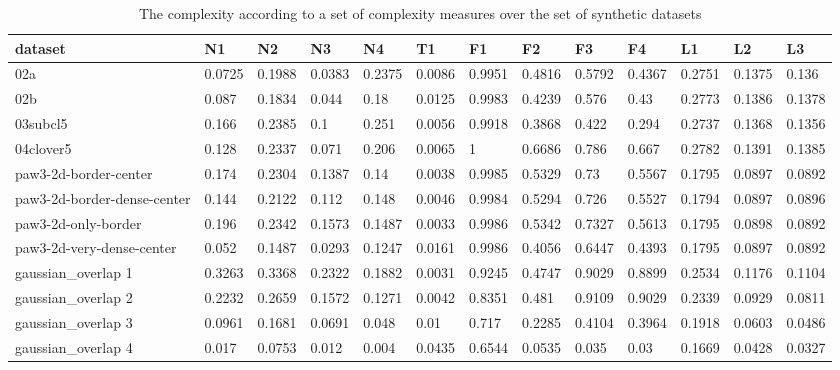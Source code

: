 \begin{landscape}
    \begin{table}[htp]
        \centering
        \caption{The complexity according to a set of complexity measures over the set of synthetic datasets}
        \begin{tabular}{|l|l|l|l|l|l|l|l|l|l|l|l|l|}
        \hline
            dataset & N1 & N2 & N3 & N4 & T1 & F1 & F2 & F3 & F4 & L1 & L2 & L3 \\ \hline
            02a & 0.0725 & 0.1988 & 0.0383 & 0.2375 & 0.0086 & 0.9951 & 0.4816 & 0.5792 & 0.4367 & 0.2751 & 0.1375 & 0.136 \\ \hline
            02b & 0.087 & 0.1834 & 0.044 & 0.18 & 0.0125 & 0.9983 & 0.4239 & 0.576 & 0.43 & 0.2773 & 0.1386 & 0.1378 \\ \hline
            03subcl5 & 0.166 & 0.2385 & 0.1 & 0.251 & 0.0056 & 0.9918 & 0.3868 & 0.422 & 0.294 & 0.2737 & 0.1368 & 0.1356 \\ \hline
            04clover5 & 0.128 & 0.2337 & 0.071 & 0.206 & 0.0065 & 1 & 0.6686 & 0.786 & 0.667 & 0.2782 & 0.1391 & 0.1385 \\ \hline
            paw3-2d-border-center & 0.174 & 0.2304 & 0.1387 & 0.14 & 0.0038 & 0.9985 & 0.5329 & 0.73 & 0.5567 & 0.1795 & 0.0897 & 0.0892 \\ \hline
            paw3-2d-border-dense-center & 0.144 & 0.2122 & 0.112 & 0.148 & 0.0046 & 0.9984 & 0.5294 & 0.726 & 0.5527 & 0.1794 & 0.0897 & 0.0896 \\ \hline
            paw3-2d-only-border & 0.196 & 0.2342 & 0.1573 & 0.1487 & 0.0033 & 0.9986 & 0.5342 & 0.7327 & 0.5613 & 0.1795 & 0.0898 & 0.0892 \\ \hline
            paw3-2d-very-dense-center & 0.052 & 0.1487 & 0.0293 & 0.1247 & 0.0161 & 0.9986 & 0.4056 & 0.6447 & 0.4393 & 0.1795 & 0.0897 & 0.0892 \\ \hline
            gaussian\_overlap 1 & 0.3263 & 0.3368 & 0.2322 & 0.1882 & 0.0031 & 0.9245 & 0.4747 & 0.9029 & 0.8899 & 0.2534 & 0.1176 & 0.1104 \\ \hline
            gaussian\_overlap 2 & 0.2232 & 0.2659 & 0.1572 & 0.1271 & 0.0042 & 0.8351 & 0.481 & 0.9109 & 0.9029 & 0.2339 & 0.0929 & 0.0811 \\ \hline
            gaussian\_overlap 3 & 0.0961 & 0.1681 & 0.0691 & 0.048 & 0.01 & 0.717 & 0.2285 & 0.4104 & 0.3964 & 0.1918 & 0.0603 & 0.0486 \\ \hline
            gaussian\_overlap 4 & 0.017 & 0.0753 & 0.012 & 0.004 & 0.0435 & 0.6544 & 0.0535 & 0.035 & 0.03 & 0.1669 & 0.0428 & 0.0327 \\ \hline

\end{tabular}
\end{table}
\end{landscape}
